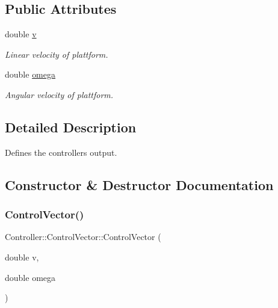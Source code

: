 \subsection*{Public Attributes}
\begin{DoxyCompactItemize}
\item 
\mbox{\label{structController_1_1ControlVector_af8d8ff93ddf343a13a35bba355d39976}} 
double \hyperlink{structController_1_1ControlVector_af8d8ff93ddf343a13a35bba355d39976}{v}
\begin{DoxyCompactList}\small\item\em Linear velocity of plattform. \end{DoxyCompactList}\item 
\mbox{\label{structController_1_1ControlVector_ad5963169c4ea0c021cb923191aef7ed3}} 
double \hyperlink{structController_1_1ControlVector_ad5963169c4ea0c021cb923191aef7ed3}{omega}
\begin{DoxyCompactList}\small\item\em Angular velocity of plattform. \end{DoxyCompactList}\end{DoxyCompactItemize}


\subsection{Detailed Description}
Defines the controllers output. 

\subsection{Constructor \& Destructor Documentation}
\mbox{\label{structController_1_1ControlVector_a547dd5c56a7be54acb7c44f7fdf52c57}} 
\subsubsection{\texorpdfstring{Control\+Vector()}{ControlVector()}}
{\footnotesize\ttfamily Controller\+::\+Control\+Vector\+::\+Control\+Vector (\begin{DoxyParamCaption}\item[{double}]{v,  }\item[{double}]{omega }\end{DoxyParamCaption})\hspace{0.3cm}{\ttfamily [inline]}}




